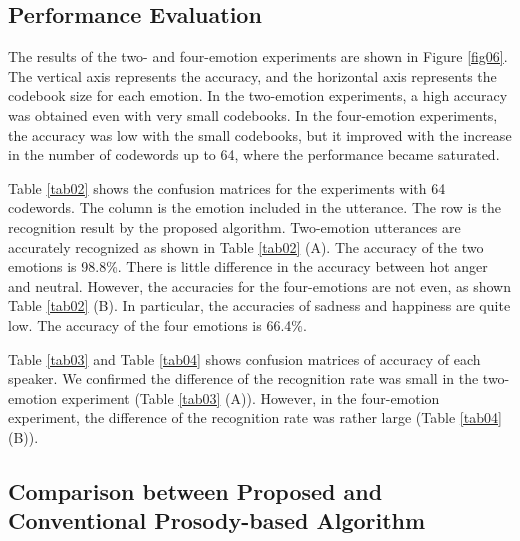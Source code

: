 \documentclass[english]{jnlp_1.3e}
\begin{document}
\subsection{Performance Evaluation}

\begin{table}[b]

\end{table} 
\begin{table}[b]

\end{table}


The results of the two- and four-emotion experiments are shown in Figure \ref{fig06}. The vertical axis represents the accuracy, and the horizontal axis represents the codebook size for each emotion. In the two-emotion experiments, a high accuracy was obtained even with very small codebooks. In the four-emotion experiments, the accuracy was low with the small codebooks, but it improved with the increase in the number of codewords up to 64, where the performance became saturated.

Table \ref{tab02} shows the confusion matrices for the experiments with 64 codewords. The column is the emotion included in the utterance. The row is the recognition result by the proposed algorithm. Two-emotion utterances are accurately recognized as shown in Table \ref{tab02} (A). The accuracy of the two emotions is 98.8\%. There is little difference in the accuracy between hot anger and neutral. However, the accuracies for the four-emotions are not even, as shown Table \ref{tab02} (B). In particular, the accuracies of sadness and happiness are quite low. The accuracy of the four emotions is 66.4\%.


\begin{table}[b]
\vspace{-\baselineskip}

\end{table} 


Table \ref{tab03} and Table \ref{tab04} shows confusion matrices of accuracy of each speaker. We confirmed the difference of the recognition rate was small in the two-emotion experiment (Table \ref{tab03} (A)). However, in the four-emotion experiment, the difference of the recognition rate was rather large (Table \ref{tab04} (B)).

\begin{table}[p]

\vspace{2\baselineskip}

\end{table} 


\subsection{Comparison between Proposed and Conventional Prosody-based Algorithm}
\end{document}
